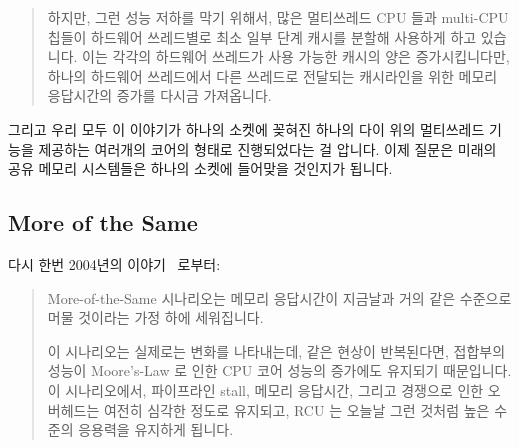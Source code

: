 \begin{quote}
	하지만, 그런 성능 저하를 막기 위해서, 많은 멀티쓰레드 CPU 들과
	multi-CPU 칩들이 하드웨어 쓰레드별로 최소 일부 단계 캐시를 분할해
	사용하게 하고 있습니다.
	이는 각각의 하드웨어 쓰레드가 사용 가능한 캐시의 양은 증가시킵니다만,
	하나의 하드웨어 쓰레드에서 다른 쓰레드로 전달되는 캐시라인을 위한
	메모리 응답시간의 증가를 다시금 가져옵니다.

\end{quote}

그리고 우리 모두 이 이야기가 하나의 소켓에 꽂혀진 하나의 다이 위의 멀티쓰레드
기능을 제공하는 여러개의 코어의 형태로 진행되었다는 걸 압니다.
이제 질문은 미래의 공유 메모리 시스템들은 하나의 소켓에 들어맞을 것인지가
됩니다.

\subsection{More of the Same}
\label{sec:meas:More of the Same}

다시 한번 2004년의 이야기~\cite{PaulEdwardMcKenneyPhD} 로부터:

\begin{quote}
	More-of-the-Same 시나리오는 메모리 응답시간이 지금날과 거의 같은
	수준으로 머물 것이라는 가정 하에 세워집니다.

	이 시나리오는 실제로는 변화를 나타내는데, 같은 현상이 반복된다면,
	접합부의 성능이 Moore's-Law 로 인한 CPU 코어 성능의 증가에도 유지되기
	때문입니다.
	이 시나리오에서, 파이프라인 stall, 메모리 응답시간, 그리고 경쟁으로
	인한 오버헤드는 여전히 심각한 정도로 유지되고, RCU 는 오늘날 그런
	것처럼 높은 수준의 응용력을 유지하게 됩니다.

\end{quote}

